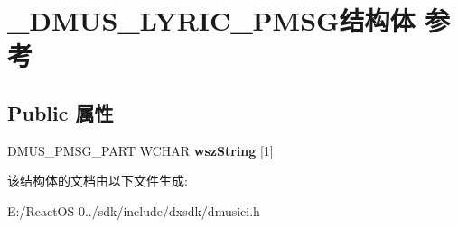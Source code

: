 \hypertarget{struct___d_m_u_s___l_y_r_i_c___p_m_s_g}{}\section{\+\_\+\+D\+M\+U\+S\+\_\+\+L\+Y\+R\+I\+C\+\_\+\+P\+M\+S\+G结构体 参考}
\label{struct___d_m_u_s___l_y_r_i_c___p_m_s_g}
\subsection*{Public 属性}
\begin{DoxyCompactItemize}
\item 
\mbox{\label{struct___d_m_u_s___l_y_r_i_c___p_m_s_g_ac9923148538646f75c49b1649fdbd142}} 
D\+M\+U\+S\+\_\+\+P\+M\+S\+G\+\_\+\+P\+A\+RT W\+C\+H\+AR {\bfseries wsz\+String} \mbox{[}1\mbox{]}
\end{DoxyCompactItemize}


该结构体的文档由以下文件生成\+:\begin{DoxyCompactItemize}
\item 
E\+:/\+React\+O\+S-\/0../sdk/include/dxsdk/dmusici.\+h\end{DoxyCompactItemize}

